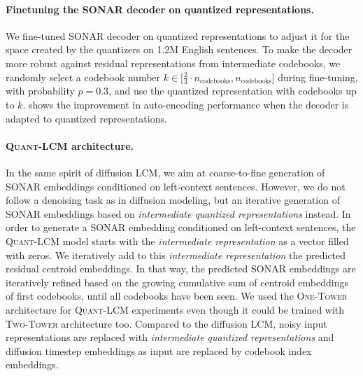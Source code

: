 \documentclass[twoside,11pt]{fairmeta}
\newcommand{\sonar}{\textsc{SONAR}\xspace}
\newcommand{\lcm}{\textsc{LCM}\xspace}
\newcommand{\twotower}{\textsc{Two-Tower}\xspace}
\newcommand{\interleaved}{\textsc{One-Tower}\xspace}
\newcommand{\qlcm}{\textsc{Quant-LCM}\xspace}
\begin{document}
\paragraph{Finetuning the SONAR decoder on quantized representations.}
We fine-tuned SONAR decoder on quantized representations to adjust it for the space created by the quantizers on 1.2M English sentences.
To make the decoder more robust against residual representations from intermediate codebooks, we randomly select a codebook number $k \in \bigl[\frac{2}{3} \cdot n_\text{codebooks}, n_\text{codebooks}\bigl]$ during fine-tuning, with probability $p = 0.3$, and use the quantized representation with codebooks up to $k$.
 shows the improvement in auto-encoding performance when the decoder is adapted to quantized representations.

\paragraph{\qlcm architecture.}
In the same spirit of diffusion \lcm, we aim at coarse-to-fine generation of \sonar embeddings conditioned on left-context sentences. However, we do not follow a denoising task as in diffusion modeling, but an iterative generation of \sonar embeddings based on \textit{intermediate quantized representations} instead. In order to generate a \sonar embedding conditioned on left-context sentences, the \qlcm model starts with the \textit{intermediate representation} as a  vector filled with zeros. We iteratively add to this \textit{intermediate representation} the predicted residual centroid embeddings. In that way, the predicted \sonar embeddings are iteratively refined based on the growing cumulative sum of centroid embeddings of first codebooks, until all codebooks have been seen. We used the \interleaved architecture for \qlcm experiments even though it could be trained with \twotower architecture too. Compared to the diffusion \lcm, noisy input representations are replaced with \textit{intermediate quantized representations} and diffusion timestep embeddings as input are replaced by codebook index embeddings. 
\end{document}
